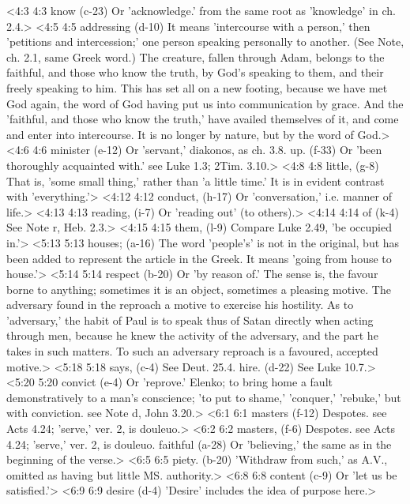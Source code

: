 <4:3 4:3  know (c-23)  Or 'acknowledge.' from the same root as 'knowledge' in ch. 2.4.>
<4:5 4:5  addressing (d-10)  It means 'intercourse with a person,' then 'petitions and  intercession;' one person speaking personally to another. (See  Note, ch. 2.1, same Greek word.) The creature, fallen through  Adam, belongs to the faithful, and those who know the truth, by  God's speaking to them, and their freely speaking to him. This  has set all on a new footing, because we have met God again,  the word of God having put us into communication by grace. And  the 'faithful, and those who know the truth,' have availed  themselves of it, and come and enter into intercourse. It is no  longer by nature, but by the word of God.>
<4:6 4:6  minister (e-12)  Or 'servant,' diakonos, as ch. 3.8.
  up. (f-33)  Or 'been thoroughly acquainted with.' see Luke 1.3; 2Tim. 3.10.>
<4:8 4:8  little, (g-8)  That is, 'some small thing,' rather than 'a little time.' It  is in evident contrast with 'everything.'>
<4:12 4:12  conduct, (h-17)  Or 'conversation,' i.e. manner of life.>
<4:13 4:13  reading, (i-7)  Or 'reading out' (to others).>
<4:14 4:14  of (k-4)  See Note r, Heb. 2.3.>
<4:15 4:15  them, (l-9)  Compare Luke 2.49, 'be occupied in.'>
<5:13 5:13  houses; (a-16)  The word 'people's' is not in the original, but has been  added to represent the article in the Greek. It means 'going  from house to house.'>
<5:14 5:14  respect (b-20)  Or 'by reason of.' The sense is, the favour borne to  anything; sometimes it is an object, sometimes a pleasing  motive. The adversary found in the reproach a motive to  exercise his hostility. As to 'adversary,' the habit of Paul  is to speak thus of Satan directly when acting through men,  because he knew the activity of the adversary, and the part he  takes in such matters. To such an adversary reproach is a  favoured, accepted motive.>
<5:18 5:18  says, (c-4)  See Deut. 25.4.
  hire. (d-22)  See Luke 10.7.>
<5:20 5:20  convict (e-4)  Or 'reprove.' Elenko; to bring home a fault demonstratively  to a man's conscience; 'to put to shame,' 'conquer,' 'rebuke,'  but with conviction. see Note d, John 3.20.>
<6:1 6:1  masters (f-12)  Despotes. see Acts 4.24; 'serve,' ver. 2, is douleuo.>
<6:2 6:2  masters, (f-6)  Despotes. see Acts 4.24; 'serve,' ver. 2, is douleuo.
  faithful (a-28)  Or 'believing,' the same as in the beginning of the verse.>
<6:5 6:5  piety. (b-20)  'Withdraw from such,' as A.V., omitted as having but little  MS. authority.>
<6:8 6:8  content (c-9)  Or 'let us be satisfied.'>
<6:9 6:9  desire (d-4)  'Desire' includes the idea of purpose here.>
